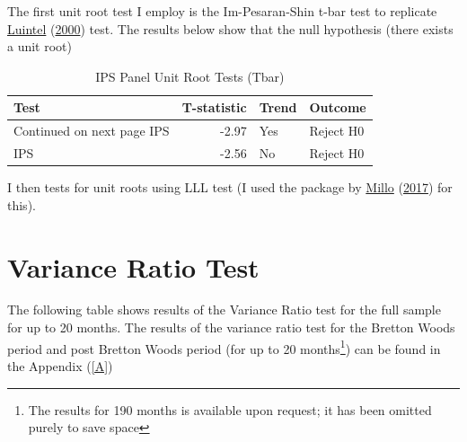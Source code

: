 \documentclass[11pt,preprint, authoryear]{elsarticle}
\numberwithin{equation}{section}
\numberwithin{figure}{section}
\numberwithin{table}{section}
\let\rmarkdownfootnote\footnote%
\def\footnote{\protect\rmarkdownfootnote}
\begin{document}
The first unit root test I employ is the Im-Pesaran-Shin t-bar test to
replicate \protect\hyperlink{ref-Kul}{Luintel}
(\protect\hyperlink{ref-Kul}{2000}) test. The results below show that
the null hypothesis (there exists a unit root)

\begingroup\fontsize{12pt}{13pt}\selectfont
\begin{longtable}{lrll}
\caption{IPS Panel Unit Root Tests (Tbar)} \\ 
  \toprule
Test & T-statistic & Trend & Outcome \\ 
  \hline 
\endhead 
\hline 
{\footnotesize Continued on next page} 
\endfoot 
\endlastfoot 
 \midrule
IPS & -2.97 & Yes & Reject H0 \\ 
  IPS & -2.56 & No & Reject H0 \\ 
   \bottomrule
\end{longtable}
\endgroup

I then tests for unit roots using LLL test (I used the package by
\protect\hyperlink{ref-plm}{Millo} (\protect\hyperlink{ref-plm}{2017})
for this).

\hypertarget{variance-ratio-test}{%
\section{\texorpdfstring{Variance Ratio Test
\label{Var}}{Variance Ratio Test }}\label{variance-ratio-test}}

The following table shows results of the Variance Ratio test for the
full sample for up to 20 months. The results of the variance ratio test
for the Bretton Woods period and post Bretton Woods period (for up to 20
months\footnote{The results for 190 months is available upon request; it
  has been omitted purely to save space}) can be found in the Appendix
(\ref{A})
\end{document}
